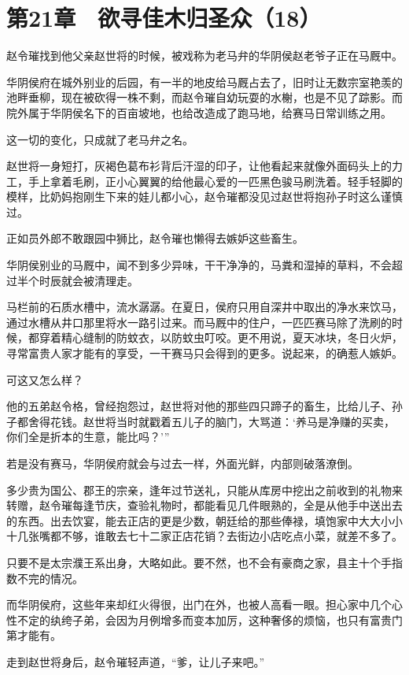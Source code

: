 \section{第21章　欲寻佳木归圣众（18）}

赵令璀找到他父亲赵世将的时候，被戏称为老马弁的华阴侯赵老爷子正在马厩中。

华阴侯府在城外别业的后园，有一半的地皮给马厩占去了，旧时让无数宗室艳羡的池畔垂柳，现在被砍得一株不剩，而赵令璀自幼玩耍的水榭，也是不见了踪影。而院外属于华阴侯名下的百亩坡地，也给改造成了跑马地，给赛马日常训练之用。

这一切的变化，只成就了老马弁之名。

赵世将一身短打，灰褐色葛布衫背后汗湿的印子，让他看起来就像外面码头上的力工，手上拿着毛刷，正小心翼翼的给他最心爱的一匹黑色骏马刷洗着。轻手轻脚的模样，比奶妈抱刚生下来的娃儿都小心，赵令璀都没见过赵世将抱孙子时这么谨慎过。

正如员外郎不敢跟园中狮比，赵令璀也懒得去嫉妒这些畜生。

华阴侯别业的马厩中，闻不到多少异味，干干净净的，马粪和湿掉的草料，不会超过半个时辰就会被清理走。

马栏前的石质水槽中，流水潺潺。在夏日，侯府只用自深井中取出的净水来饮马，通过水槽从井口那里将水一路引过来。而马厩中的住户，一匹匹赛马除了洗刷的时候，都穿着精心缝制的防蚊衣，以防蚊虫叮咬。更不用说，夏天冰块，冬日火炉，寻常富贵人家才能有的享受，一干赛马只会得到的更多。说起来，的确惹人嫉妒。

可这又怎么样？

他的五弟赵令格，曾经抱怨过，赵世将对他的那些四只蹄子的畜生，比给儿子、孙子都舍得花钱。赵世将当时就戳着五儿子的脑门，大骂道：‘养马是净赚的买卖，你们全是折本的生意，能比吗？’”

若是没有赛马，华阴侯府就会与过去一样，外面光鲜，内部则破落潦倒。

多少贵为国公、郡王的宗亲，逢年过节送礼，只能从库房中挖出之前收到的礼物来转赠，赵令璀每逢节庆，查验礼物时，都能看见几件眼熟的，全是从他手中送出去的东西。出去饮宴，能去正店的更是少数，朝廷给的那些俸禄，填饱家中大大小小十几张嘴都不够，谁敢去七十二家正店花销？去街边小店吃点小菜，就差不多了。

只要不是太宗濮王系出身，大略如此。要不然，也不会有豪商之家，县主十个手指数不完的情况。

而华阴侯府，这些年来却红火得很，出门在外，也被人高看一眼。担心家中几个心性不定的纨绔子弟，会因为月例增多而变本加厉，这种奢侈的烦恼，也只有富贵门第才能有。

走到赵世将身后，赵令璀轻声道，“爹，让儿子来吧。”

